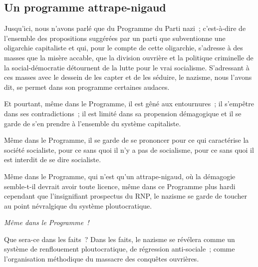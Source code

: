 \documentclass[french,twoside]{book} %
\begin{document}
\subsection[Un programme attrape-nigaud]{Un programme attrape-nigaud}
\noindent Jusqu’ici, nous n’avons parlé que du Programme du Parti nazi ; c’est-à-dire de l’ensemble des propositions suggérées par un parti que subventionne une oligarchie capitaliste et qui, pour le compte de cette oligarchie, s’adresse à des masses que la misère accable, que la division ouvrière et la politique criminelle de la social-démocratie détournent de la lutte pour le vrai socialisme. S’adressant à ces masses avec le dessein de les capter et de les séduire, le nazisme, nous l’avons dit, se permet dans son programme certaines audaces.\par
Et pourtant, même dans le Programme, il est gêné aux entournures ; il s’empêtre dans ses contradictions ; il est limité dans sa propension démagogique et il se garde de s’en prendre à l’ensemble du système capitaliste.\par
Même dans le Programme, il se garde de se prononcer pour ce qui caractérise la société socialiste, pour ce sans quoi il n’y a pas de socialisme, pour ce sans quoi il est interdit de se dire socialiste.\par
Même dans le Programme, qui n’est qu’un attrape-nigaud, où la démagogie semble-t-il devrait avoir toute licence, même dans ce Programme plus hardi cependant que l’insignifiant prospectus du RNP, le nazisme se garde de toucher au point névralgique du système ploutocratique.\par
{\itshape Même dans le Programme !}\par
Que sera-ce dans les faits ? Dans les faits, le nazisme se révélera comme un système de renflouement ploutocratique, de régression anti-sociale ; comme l’organisation méthodique du massacre des conquêtes ouvrières.
\renewcommand{\leftmark}{6 – Le Nazisme sans voiles : Une formidable machine de régression sociale}
\end{document}
